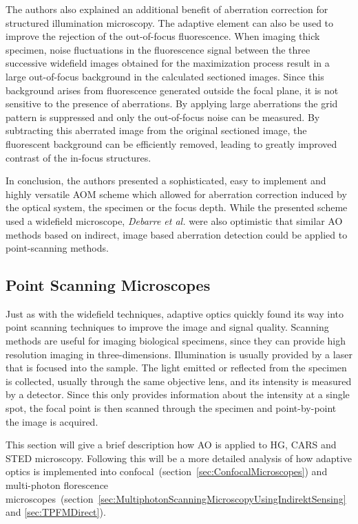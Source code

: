 The authors also explained an additional benefit of aberration correction for structured illumination microscopy. The adaptive element can also be used to improve the rejection of the out-of-focus fluorescence. When imaging thick specimen, noise fluctuations in the fluorescence signal between the three successive widefield images obtained for the maximization process result in a large out-of-focus background in the calculated sectioned images. Since this background arises from fluorescence generated outside the focal plane, it is not sensitive to the presence of aberrations. By applying large aberrations the grid pattern is suppressed and only the out-of-focus noise can be measured. By subtracting this aberrated image from the original sectioned image, the fluorescent background can be efficiently removed, leading to greatly improved contrast of the in-focus structures. 

In conclusion, the authors presented a sophisticated, easy to implement and highly versatile AOM scheme which allowed for aberration correction induced by the optical system, the specimen or the focus depth. While the presented scheme used a widefield microscope, \emph{Debarre et al.} were also optimistic that similar AO methods based on indirect, image based aberration detection could be applied to point-scanning methods. 

\subsection{Point Scanning Microscopes}
\label{sec:PointScanningMicroscopes}

Just as with the widefield techniques, adaptive optics quickly found its way into point scanning techniques to improve the image and signal quality. Scanning methods are useful for imaging biological specimens, since they can provide high resolution imaging in three-dimensions. Illumination is usually provided by a laser that is focused into the sample. The light emitted or reflected from the specimen is collected, usually through the same objective lens, and its intensity is measured by a detector. Since this only provides information about the intensity at a single spot, the focal point is then scanned through the specimen and point-by-point the image is acquired. 

This section will give a brief description how AO is applied to HG, CARS and STED microscopy. Following this will be a more detailed analysis of how adaptive optics is implemented into confocal~(section~\ref{sec:ConfocalMicroscopes}) and multi-photon florescence microscopes~(section~\ref{sec:MultiphotonScanningMicroscopyUsingIndirektSensing} and \ref{sec:TPFMDirect}). 

